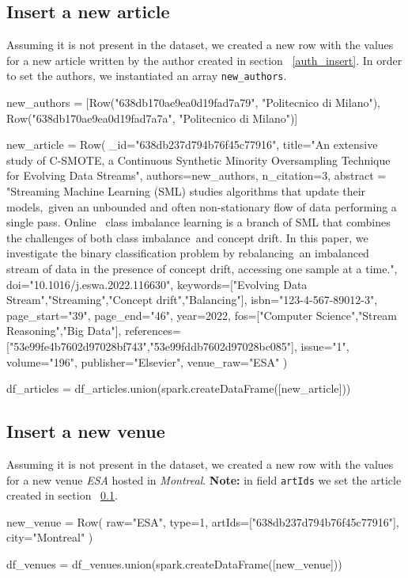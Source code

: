\documentclass{Configuration_Files/PoliMi3i_thesis}
\begin{document}
\subsection{Insert a new article}
\label{pub_insert}
Assuming it is not present in the dataset, we created a new row with the values for a new article written by the author created
in section ~\ref{auth_insert}. In order to set the authors, we instantiated an array \verb |new_authors|.\newline
\begin{python}
new_authors =  [Row("638db170ae9ea0d19fad7a79", "Politecnico di Milano"), Row("638db170ae9ea0d19fad7a7a", "Politecnico di Milano")]

new_article = Row(
    _id="638db237d794b76f45c77916",
    title="An extensive study of C-SMOTE, a Continuous Synthetic Minority Oversampling Technique for Evolving Data Streams",
    authors=new_authors,
    n_citation=3,
    abstract = "Streaming Machine Learning (SML) studies algorithms that update their models,\
        given an unbounded and often non-stationary flow of data performing a single pass. Online \
        class imbalance learning is a branch of SML that combines the challenges of both class imbalance\
        and concept drift. In this paper, we investigate the binary classification problem by rebalancing\
        an imbalanced stream of data in the presence of concept drift, accessing one sample at a time.",
        doi="10.1016/j.eswa.2022.116630",
    keywords=["Evolving Data Stream","Streaming","Concept drift","Balancing"],
    isbn="123-4-567-89012-3",
    page_start="39",
    page_end="46",
    year=2022,
    fos=["Computer Science","Stream Reasoning","Big Data"],
    references=["53e99fe4b7602d97028bf743","53e99fddb7602d97028bc085"],
    issue="1",
    volume="196",
    publisher="Elsevier",
    venue_raw="ESA"
)

df_articles = df_articles.union(spark.createDataFrame([new_article]))
\end{python}

\subsection{Insert a new venue}
Assuming it is not present in the dataset, we created a new row with the values for a new venue \emph{ESA} hosted in
\emph{Montreal}.\newline
\textbf{Note:} in field \verb |artIds| we set the article created in section ~\ref{pub_insert}.\newline
\begin{python}
new_venue = Row(
    raw="ESA",
    type=1,
    artIds=["638db237d794b76f45c77916"],
    city="Montreal"
)

df_venues = df_venues.union(spark.createDataFrame([new_venue]))
\end{python}
\end{document}
